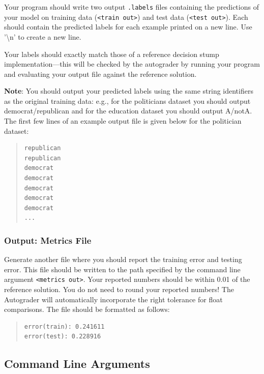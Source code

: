 \documentclass[11pt,addpoints,answers]{exam}
\numberwithin{equation}{section} %
\numberwithin{figure}{section} %
\numberwithin{table}{section} %
\begin{document}
Your program should write two output \lstinline{.labels} files containing the predictions of your model on training data (\lstinline{<train out>}) and test data (\lstinline{<test out>}). Each should contain the predicted labels for each example printed on a new line. Use '\textbackslash n' to create a new line.

Your labels should exactly match those of a reference decision stump implementation---this will be checked by the autograder by running your program and evaluating your output file against the reference solution.

\textbf{Note}: You should output your predicted labels using the same string identifiers as the original training data: e.g., for the politicians dataset you should output democrat/republican and for the education dataset you should output A/notA.
%
The first few lines of an example output file is given below for the politician dataset:
\begin{quote}
\begin{verbatim}
republican
republican
democrat
democrat
democrat
democrat
democrat
...
\end{verbatim}
\end{quote}

\subsubsection{Output: Metrics File}
\label{sec:metrics}

Generate another file where you should report the training error and testing error. This file should be written to the path specified by the command line argument \lstinline{<metrics out>}. Your reported numbers should be within 0.01 of the reference solution. You do not need to round your reported numbers! The Autograder will automatically incorporate the right tolerance for float comparisons. The file should be formatted as follows:

\begin{quote}
\begin{verbatim}
error(train): 0.241611
error(test): 0.228916
\end{verbatim}
\end{quote}

\subsection{Command Line Arguments}
\end{document}
